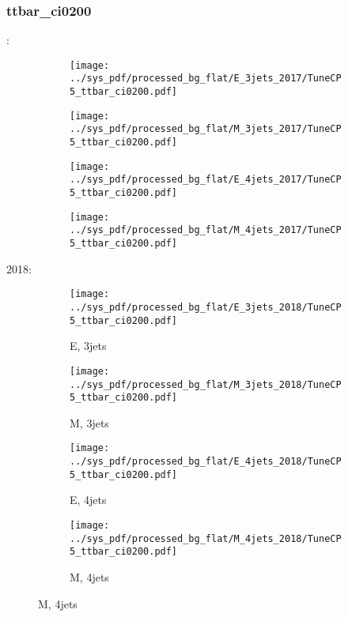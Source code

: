 \documentclass{beamer}
\begin{document}
\begin{frame}
\frametitle{ttbar_ci0200}
\fontsize{5}{1}:
\begin{figure}
\centering
\begin{subfigure}[b]{0.24\textwidth}
\texttt{[image: ../sys\_pdf/processed\_bg\_flat/E\_3jets\_2017/TuneCP5\_ttbar\_ci0200.pdf]}
\end{subfigure}
\begin{subfigure}[b]{0.24\textwidth}
\texttt{[image: ../sys\_pdf/processed\_bg\_flat/M\_3jets\_2017/TuneCP5\_ttbar\_ci0200.pdf]}
\end{subfigure}
\begin{subfigure}[b]{0.24\textwidth}
\texttt{[image: ../sys\_pdf/processed\_bg\_flat/E\_4jets\_2017/TuneCP5\_ttbar\_ci0200.pdf]}
\end{subfigure}
\begin{subfigure}[b]{0.24\textwidth}
\texttt{[image: ../sys\_pdf/processed\_bg\_flat/M\_4jets\_2017/TuneCP5\_ttbar\_ci0200.pdf]}
\end{subfigure}
\end{figure}
2018:
\begin{figure}
\centering
\begin{subfigure}[b]{0.24\textwidth}
\texttt{[image: ../sys\_pdf/processed\_bg\_flat/E\_3jets\_2018/TuneCP5\_ttbar\_ci0200.pdf]}
\captionsetup{font=tiny}
\caption{E, 3jets}
\end{subfigure}
\begin{subfigure}[b]{0.24\textwidth}
\texttt{[image: ../sys\_pdf/processed\_bg\_flat/M\_3jets\_2018/TuneCP5\_ttbar\_ci0200.pdf]}
\captionsetup{font=tiny}
\caption{M, 3jets}
\end{subfigure}
\begin{subfigure}[b]{0.24\textwidth}
\texttt{[image: ../sys\_pdf/processed\_bg\_flat/E\_4jets\_2018/TuneCP5\_ttbar\_ci0200.pdf]}
\captionsetup{font=tiny}
\caption{E, 4jets}
\end{subfigure}
\begin{subfigure}[b]{0.24\textwidth}
\texttt{[image: ../sys\_pdf/processed\_bg\_flat/M\_4jets\_2018/TuneCP5\_ttbar\_ci0200.pdf]}
\captionsetup{font=tiny}
\caption{M, 4jets}
\end{subfigure}
\end{figure}
\end{frame}
\end{document}
